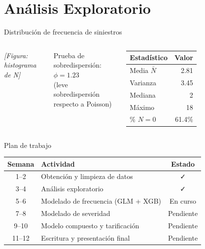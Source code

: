 \documentclass[aspectratio=169, 12pt]{beamer}
\begin{document}
\section{Análisis Exploratorio}

\begin{frame}{Distribución de frecuencia de siniestros}
  \begin{columns}
      \textit{[Figura: histograma de N]}

      \vspace{0.5em}
      \small Prueba de sobredispersión: $\hat{\phi} = 1.23$\\
      (leve sobredispersión respecto a Poisson)
      \begin{table}
        \small
        \begin{tabular}{lr}
          \toprule
          Estadístico & Valor \\
          \midrule
          Media $\bar{N}$ & 2.81 \\
          Varianza & 3.45 \\
          Mediana & 2 \\
          Máximo & 18 \\
          \% $N=0$ & 61.4\% \\
          \bottomrule
        \end{tabular}
      \end{table}
  \end{columns}
\end{frame}

\begin{frame}{Plan de trabajo}
  \begin{table}
    \centering
    \begin{tabular}{clc}
      \toprule
      \textbf{Semana} & \textbf{Actividad} & \textbf{Estado} \\
      \midrule
      1–2 & Obtención y limpieza de datos & {\color{green}✓} \\
      3–4 & Análisis exploratorio & {\color{green}✓} \\
      5–6 & Modelado de frecuencia (GLM + XGB) & {\color{orange}En curso} \\
      7–8 & Modelado de severidad & Pendiente \\
      9–10 & Modelo compuesto y tarificación & Pendiente \\
      11–12 & Escritura y presentación final & Pendiente \\
      \bottomrule
    \end{tabular}
  \end{table}
\end{frame}
\end{document}

